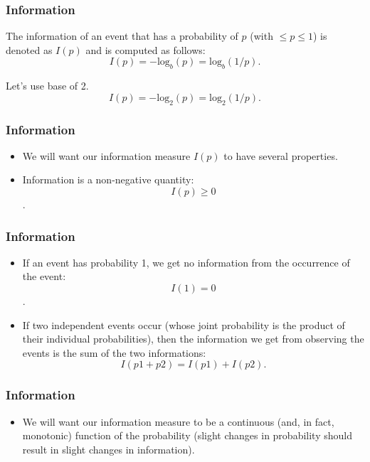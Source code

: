 \documentclass{beamer}
\begin{document}
\begin{frame}
	\Large
	\frametitle{Information}
The information of an event that has a probability of $p$ (with $\leq p \leq 1$) is denoted as $I(p)$ and is computed as follows:
\[
I(p) = -\mathrm{log}_b(p) = \mathrm{log}_b(1/p)   .
\]

Let's use base of 2.
\[
I(p) = -\mathrm{log}_2(p) = \mathrm{log}_2(1/p)   .
\]

\end{frame}
\begin{frame}
	\Large
	\frametitle{Information}
\begin{itemize}
\item We will want our information measure $I(p)$ to have several
properties.
 \item Information is a non-negative quantity:
\[I(p) \geq 0\]. 
\end{itemize}



\end{frame}

\begin{frame}
	\Large
	\frametitle{Information}
	
\begin{itemize}
\item If an event has probability 1, we get no
information from the occurrence of the event: \[I(1) = 0\]. 

\item If
two independent events occur (whose joint probability is the
product of their individual probabilities), then the information
we get from observing the events is the sum of the two
informations: \[I(p1 + p2) = I(p1)+I(p2).\]

\end{itemize}

\end{frame}

\begin{frame}
	\Large
	\frametitle{Information}
	
\begin{itemize}
\item We will want our information measure to be a continuous
(and, in fact, monotonic) function of the probability (slight
changes in probability should result in slight changes in
information).
\end{itemize}

\end{frame}
\end{document}

